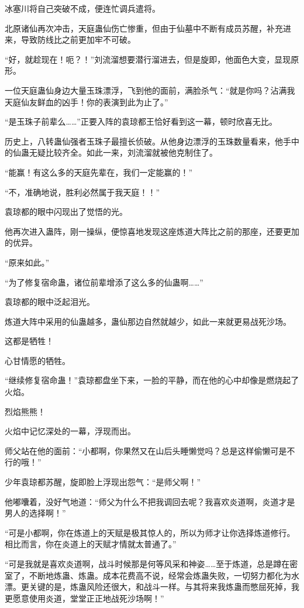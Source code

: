 \begin{this_body}
冰塞川将自己突破不成，便连忙调兵遣将。

北原诸仙再次冲击，天庭蛊仙伤亡惨重，但由于仙墓中不断有成员苏醒，补充进来，导致防线比之前更加牢不可破。

“好，就趁现在！呃？！”刘流溜想要潜行溜进去，但是旋即，他面色大变，显现原形。

一位天庭蛊仙身边大量玉珠漂浮，飞到他的面前，满脸杀气：“就是你吗？沾满我天庭仙友鲜血的凶手！你的表演到此为止了。”

“是玉珠子前辈么……”正要入阵的袁琼都王恰好看到这一幕，顿时欣喜无比。

历史上，八转蛊仙强者玉珠子最擅长侦破。从他身边漂浮的玉珠数量看来，他手中的仙蛊无疑比较齐全。如此一来，刘流溜就被他克制住了。

“能赢！有这么多的天庭先辈在，我们一定能赢的！”

“不，准确地说，胜利必然属于我天庭！！”

袁琼都的眼中闪现出了觉悟的光。

他再次进入蛊阵，刚一操纵，便惊喜地发现这座炼道大阵比之前的那座，还要更加的优异。

“原来如此。”

“为了修复宿命蛊，诸位前辈增添了这么多的仙蛊啊……”

袁琼都的眼中泛起泪光。

炼道大阵中采用的仙蛊越多，蛊仙那边自然就越少，如此一来就更易战死沙场。

这都是牺牲！

心甘情愿的牺牲。

“继续修复宿命蛊！”袁琼都盘坐下来，一脸的平静，而在他的心中却像是燃烧起了火焰。

烈焰熊熊！

火焰中记忆深处的一幕，浮现而出。

师父站在他的面前：“小都啊，你果然又在山后头睡懒觉吗？总是这样偷懒可是不行的哦！”

少年袁琼都苏醒，旋即脸上浮现出怨气：“是师父啊！”

他嘟囔着，没好气地道：“师父为什么不把我调回去呢？我喜欢炎道啊，炎道才是男人的选择啊！”

“可是小都啊，你在炼道上的天赋是极其惊人的，所以为师才让你选择炼道修行。相比而言，你在炎道上的天赋才情就太普通了。”

“可是我就是喜欢炎道啊，战斗时候那是何等风采和神姿……至于炼道，总是蹲在密室了，不断地炼蛊、炼蛊。成本花费高不说，经常会炼蛊失败，一切努力都化为水漂。更关键的是，炼蛊风险还很大，和战斗一样。与其将来我炼蛊而憋屈死掉，我更愿意使用炎道，堂堂正正地战死沙场啊！”


\end{this_body}
